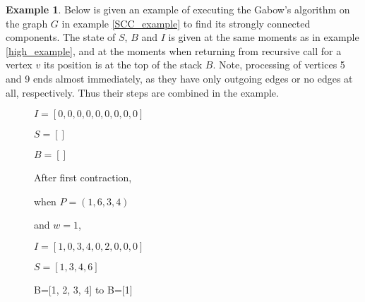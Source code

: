 \documentclass{report}
\theoremstyle{plain}
\theoremstyle{definition}
\newtheorem{example}{Example}
\theoremstyle{remark}
\numberwithin{definition}{chapter}
\numberwithin{example}{chapter}
\numberwithin{figure}{chapter}
\numberwithin{theorem}{chapter}
\numberwithin{lemma}{chapter}
\begin{document}
\begin{example}

Below is given an example of executing the Gabow's algorithm on the graph $G$ in example \ref{SCC_example} to find its strongly connected components. The state of $S$, $B$ and $I$ is given at the same moments as in example \ref{high_example}, and at the moments when returning from recursive call for a vertex $v$ its position is at the top of the stack $B$. Note, processing of vertices 5 and 9 ends almost immediately, as they have only outgoing edges or no edges at all, respectively. Thus their steps are combined in the example.

\begin{figure}[h]

\begin{minipage}[h]{0.24\textwidth}

$I=[0, 0, 0, 0, 0, 0, 0, 0, 0]$

$S=[]$

$B=[]$

\end{minipage}
\hfill
{}

After first contraction,

when $P=(1,6,3,4)$

and $w=1$,

$I=[1, 0, 3, 4, 0, 2, 0, 0, 0]$

$S=[1, 3, 4, 6]$

B=[1, 2, 3, 4] to B=[1]
\endminipage\hfill
{}


\end{figure}
\end{example}
\end{document}
